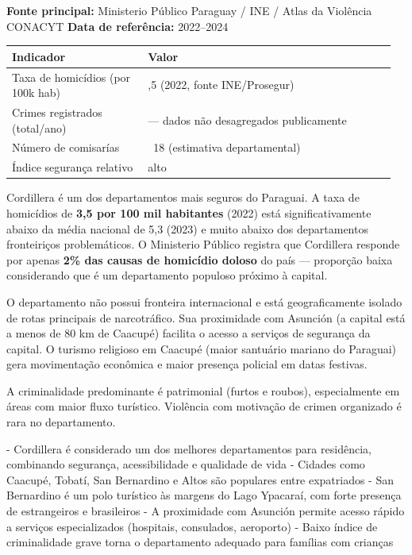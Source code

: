 \textbf{Fonte principal:} Ministerio Público Paraguay / INE / Atlas da Violência CONACYT
\textbf{Data de referência:} 2022--2024


{\small
\setlength{\tabcolsep}{3pt}
\renewcommand{\arraystretch}{1.12}
\begin{tabularx}{\linewidth}{>{\raggedright\arraybackslash}p{0.34\linewidth} >{\raggedright\arraybackslash}p{0.62\linewidth}}
\toprule
Indicador & Valor \\
\midrule
Taxa de homicídios (por 100k hab) & 3,5 (2022, fonte INE/Prosegur) \\
Crimes registrados (total/ano) & --- dados não desagregados publicamente \\
Número de comisarías & ~18 (estimativa departamental) \\
Índice segurança relativo & alto \\
\bottomrule
\end{tabularx}
}


Cordillera é um dos departamentos mais seguros do Paraguai. A taxa de homicídios de \textbf{3,5 por 100 mil habitantes} (2022) está significativamente abaixo da média nacional de 5,3 (2023) e muito abaixo dos departamentos fronteiriços problemáticos. O Ministerio Público registra que Cordillera responde por apenas \textbf{2\% das causas de homicídio doloso} do país --- proporção baixa considerando que é um departamento populoso próximo à capital.

O departamento não possui fronteira internacional e está geograficamente isolado de rotas principais de narcotráfico. Sua proximidade com Asunción (a capital está a menos de 80 km de Caacupé) facilita o acesso a serviços de segurança da capital. O turismo religioso em Caacupé (maior santuário mariano do Paraguai) gera movimentação econômica e maior presença policial em datas festivas.

A criminalidade predominante é patrimonial (furtos e roubos), especialmente em áreas com maior fluxo turístico. Violência com motivação de crimen organizado é rara no departamento.


- Cordillera é considerado um dos melhores departamentos para residência, combinando segurança, acessibilidade e qualidade de vida
- Cidades como Caacupé, Tobatí, San Bernardino e Altos são populares entre expatriados
- San Bernardino é um polo turístico às margens do Lago Ypacaraí, com forte presença de estrangeiros e brasileiros
- A proximidade com Asunción permite acesso rápido a serviços especializados (hospitais, consulados, aeroporto)
- Baixo índice de criminalidade grave torna o departamento adequado para famílias com crianças




